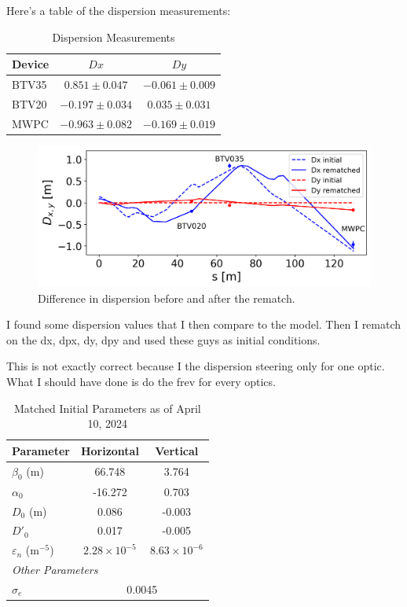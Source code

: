 \documentclass[a4paper,
               ]{jacow}
\begin{document}
Here's a table of the dispersion measurements:

\begin{table}[h!]
\centering
\caption{Dispersion Measurements}
\begin{tabular}{l c c}
\hline
Device & \(Dx\) & \(Dy\) \\
\hline
BTV35  & \(0.851 \pm 0.047\) & \(-0.061 \pm 0.009\) \\
BTV20  & \(-0.197 \pm 0.034\) & \(0.035 \pm 0.031\) \\
MWPC   & \(-0.963 \pm 0.082\) & \(-0.169 \pm 0.019\) \\
\hline
\end{tabular}
\end{table}



\begin{figure}[!htb]
   \centering
   \includegraphics*[width=1.0\columnwidth]{dispersion_diff.png}
   \caption{Difference in dispersion before and after the rematch.}
   \label{fig:dispersion}
\end{figure}

I found some dispersion values that I then compare to the model. Then I rematch on the dx, dpx, dy, dpy and used these guys as initial conditions.

This is not exactly correct because I the dispersion steering only for one optic. What I should have done is do the frev for every optics.

\begin{table}[h!]
    \centering
    \caption{Matched Initial Parameters as of April 10, 2024}
    \label{tab:initial_conditions_2024}
    \begin{tabular}{l c c}
        \hline
        Parameter & Horizontal & Vertical \\
        \hline
        $\beta_0$ (m) & 66.748 & 3.764 \\
        $\alpha_0$ & -16.272 & 0.703 \\
        $D_0$ (m) & 0.086 & -0.003 \\
        $D'_0$ & 0.017 & -0.005 \\
        $\varepsilon_{n}$ ($\text{m}^{-5}$) & $2.28 \times 10^{-5}$ & $8.63 \times 10^{-6}$ \\
        \hline
        \multicolumn{2}{l}{\textit{Other Parameters}} \\
        \hline
        $\sigma_e$ & \multicolumn{2}{c}{0.0045} \\
        \hline
    \end{tabular}
\end{table}
\end{document}
